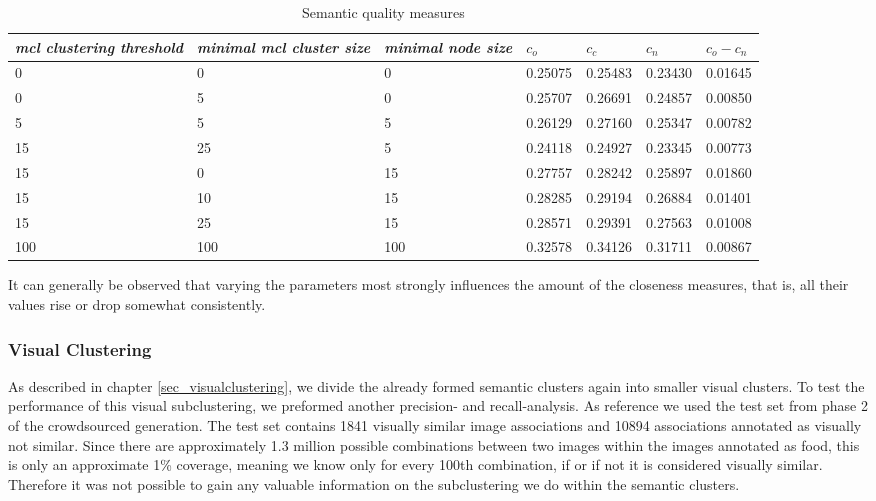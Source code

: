 \begin{table}[h]
    \begin{tabular}{| p{2.2cm} | p{2.2cm} | p{2cm} || p{1.4cm} | p{1.4cm} | p{1.4cm} | p{1.4cm} |}
	\hline    
    \emph{mcl clustering threshold} & \emph{minimal mcl cluster size} 	& \emph{minimal node size} & $c_o $ & $c_c$ & $c_n$ & $c_o - c_n$ \\ \hline
    0 	& 0 	& 0 & 0.25075 & 0.25483 & 0.23430 & 0.01645 \\ \hline
    0 	& 5 	& 0 & 0.25707 & 0.26691 & 0.24857 & 0.00850 \\ \hline
    5 	& 5 	& 5 & 0.26129 & 0.27160 & 0.25347 & 0.00782 \\ \hline     
    15 	& 25 &  5 & 0.24118 & 0.24927 & 0.23345 & 0.00773\\ \hline
    15 	& 0 & 15 & 0.27757 & 0.28242 & 0.25897 & 0.01860 \\ \hline
    15 	& 10 & 15 & 0.28285 & 0.29194 & 0.26884 & 0.01401 \\ \hline
    15 	& 25 & 15 & 0.28571 & 0.29391 & 0.27563 & 0.01008 \\ \hline
    	100 	& 100 & 100 & 0.32578 & 0.34126 & 0.31711 & 0.00867 \\ \hline
    \end{tabular}
    \caption{Semantic quality measures}
	\label{tab_treeevaluation}
\end{table}

It can generally be observed that varying the parameters most strongly influences the amount of the closeness measures, that is, all their values rise or drop somewhat consistently.
 

\subsubsection*{Visual Clustering}

As described in chapter \ref{sec_visualclustering}, we divide the already formed semantic clusters again into smaller visual clusters. 
To test the performance of this visual subclustering, we preformed another precision- and recall-analysis. 
As reference we used the test set from phase 2 of the crowdsourced generation. 
The test set contains 1841 visually similar image associations and 10894 associations annotated as visually not similar. 
Since there are approximately 1.3 million possible combinations between two images within the images annotated as food, this is only an approximate 1\% coverage, meaning we know only for every 100th combination, if or if not it is considered visually similar. 
Therefore it was not possible to gain any valuable information on the subclustering we do within the semantic clusters.

